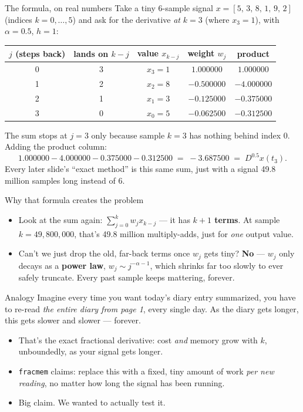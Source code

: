 \documentclass[11pt]{beamer}
\begin{document}
\begin{frame}{The formula, on real numbers}
Take a tiny 6-sample signal $x=[5,\,3,\,8,\,1,\,9,\,2]$ (indices $k{=}0,\dots,5$) and ask for the derivative \emph{at} $k=3$ (where $x_3=1$), with $\alpha=0.5$, $h=1$:
\begin{center}
\small
\begin{tabular}{ccccc}
\toprule
$j$ (steps back) & lands on $k{-}j$ & value $x_{k-j}$ & weight $w_j$ & product \\
\midrule
0 & 3 & $x_3=1$ & $1.000000$  & $1.000000$ \\
1 & 2 & $x_2=8$ & $-0.500000$ & $-4.000000$ \\
2 & 1 & $x_1=3$ & $-0.125000$ & $-0.375000$ \\
3 & 0 & $x_0=5$ & $-0.062500$ & $-0.312500$ \\
\bottomrule
\end{tabular}
\end{center}
The sum stops at $j=3$ only because sample $k=3$ has nothing behind index $0$. Adding the product column:
\[
1.000000 - 4.000000 - 0.375000 - 0.312500 \;=\; -3.687500 \;=\; D^{0.5}x(t_3).
\]
Every later slide's ``exact method'' is this same sum, just with a signal 49.8 million samples long instead of 6.
\end{frame}

\begin{frame}{Why that formula creates the problem}
\begin{itemize}
\item Look at the sum again: $\sum_{j=0}^{k} w_j x_{k-j}$ --- it has \textbf{$k{+}1$ terms}. At sample $k=49{,}800{,}000$, that's 49.8 million multiply-adds, just for \emph{one} output value.
\item Can't we just drop the old, far-back terms once $w_j$ gets tiny? \textbf{No} --- $w_j$ only decays as a \textbf{power law}, $w_j \sim j^{-\alpha-1}$, which shrinks far too slowly to ever safely truncate. Every past sample keeps mattering, forever.
\end{itemize}
\begin{exampleblock}{Analogy}
Imagine every time you want today's diary entry summarized, you have to re-read \emph{the entire diary from page 1}, every single day. As the diary gets longer, this gets slower and slower --- forever.
\end{exampleblock}
\begin{itemize}
\item That's the exact fractional derivative: cost \emph{and} memory grow with $k$, unboundedly, as your signal gets longer.
\item \texttt{fracmem} claims: replace this with a fixed, tiny amount of work \emph{per new reading}, no matter how long the signal has been running.
\item Big claim. We wanted to actually test it.
\end{itemize}
\end{frame}
\end{document}
